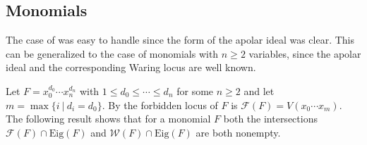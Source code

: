 \documentclass{amsart}
\numberwithin{theorem}{section}
\theoremstyle{definition}
\begin{document}
\subsection{Monomials}
The case of  was easy to handle since the form of the apolar ideal was clear. This can be generalized to the case of monomials with $n\geq 2$ variables, since the apolar ideal and the corresponding Waring locus are well known.

 Let $F=x_0^{d_0}\cdots x_n^{d_n}$ with $1 \leq d_0\leq \cdots \leq d_n$ for some $n\geq 2$ and let $m=\max\{i \ \vert \ d_i=d_0 \}$. By \cite[Theorem 3.3]{carlini2017waring} the forbidden locus of $F$ is $\mathcal{F}(F)=V(x_0\cdots x_m)$. The following result shows that for a monomial $F$ both the intersections $\mathcal{F}(F)\cap \mathrm{Eig}(F)$ and  $\mathcal{W}(F)\cap \mathrm{Eig}(F)$ are both nonempty.
\end{document}
